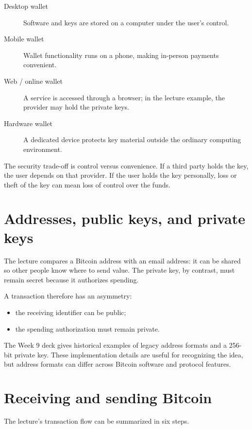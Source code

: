 \begin{description}
  \item[Desktop wallet] Software and keys are stored on a computer under the user's control.
  \item[Mobile wallet] Wallet functionality runs on a phone, making in-person payments convenient.
  \item[Web / online wallet] A service is accessed through a browser; in the lecture example, the provider may hold the private keys.
  \item[Hardware wallet] A dedicated device protects key material outside the ordinary computing environment.
\end{description}

The security trade-off is control versus convenience. If a third party holds the key, the user depends on that provider. If the user holds the key personally, loss or theft of the key can mean loss of control over the funds.

\section{Addresses, public keys, and private keys}

The lecture compares a Bitcoin address with an email address: it can be shared so other people know where to send value. The private key, by contrast, must remain secret because it authorizes spending.

A transaction therefore has an asymmetry:

\begin{itemize}
  \item the receiving identifier can be public;
  \item the spending authorization must remain private.
\end{itemize}

The Week 9 deck gives historical examples of legacy address formats and a 256-bit private key. These implementation details are useful for recognizing the idea, but address formats can differ across Bitcoin software and protocol features.

\section{Receiving and sending Bitcoin}

The lecture's transaction flow can be summarized in six steps.

